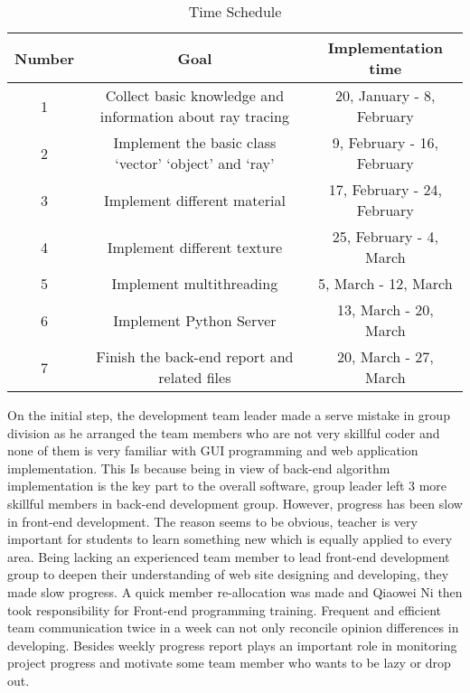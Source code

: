 \documentclass[11pt]{article}
\begin{document}
\begin{table}[h]
\begin{threeparttable}
\centering 
\caption{Time Schedule}
\begin{tabular}{|c|c|c|}
\hline
Number & Goal & Implementation time \\ \hline
1 & Collect basic knowledge and information about ray tracing & 20, January - 8, February
\\ \hline
2 & Implement the basic class ‘vector’ ‘object’ and ‘ray’ & 9, February - 16, February\\ \hline
3 & Implement different material & 17, February - 24, February\\  \hline
4 & Implement different texture & 25, February - 4, March\\ \hline
5 & Implement multithreading & 5, March - 12, March\\ \hline
6 & Implement Python Server & 13, March - 20, March\\ \hline
7 & Finish the back-end report and related files & 20, March - 27, March\\ \hline

\end{tabular}

\end{threeparttable}
\end{table}
On the initial step, the development team leader made a serve mistake in group division as he arranged the team members who are not very skillful coder and none of them is very familiar with GUI programming and web application implementation. This Is because being in view of back-end algorithm implementation is the key part to the overall software, group leader left 3 more skillful members in back-end development group. However, progress has been slow in front-end development. The reason seems to be obvious, teacher is very important for students to learn something new which is equally applied to every area. Being lacking an experienced team member to lead front-end development group to deepen their understanding of web site designing and developing, they made slow progress. A quick member re-allocation was made and Qiaowei Ni then took responsibility for Front-end programming training. Frequent and efficient team communication twice in a week can not only reconcile opinion differences in developing. Besides weekly progress report plays an important role in monitoring project progress and motivate some team member who wants to be lazy or drop out. 
\end{document}
